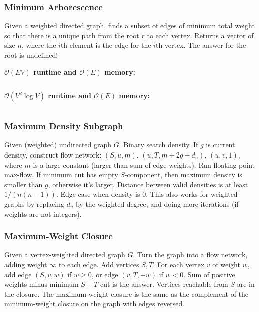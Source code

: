 \documentclass[9pt,a4paper,landscape,oneside]{amsart}
\newcommand{\mintedstyle}[2]{\inputminted{#1}{code/#2}}
\newcommand{\code}[1]{\mintedstyle{cpp}{#1}}
\begin{document}
\begin{multicols*}{3}
\subsubsection{Minimum Arborescence}
Given a weighted directed graph, finds a subset of edges of minimum
total weight so that there is a unique path from the root $r$ to each
vertex. Returns a vector of size $n$, where the $i$th element is the
edge for the $i$th vertex. The answer for the root is undefined!

\textbf{$\mathcal{O}(EV)$ runtime and $\mathcal{O}(E)$ memory:}
\code{graphs/arborescence.cpp}

\textbf{$\mathcal{O}(V^2 \log V)$ runtime and $\mathcal{O}(E)$ memory:}
\code{graphs/arborescence-v2.cpp}


\subsubsection{Maximum Density Subgraph}
Given (weighted) undirected graph $G$. Binary search density. If $g$ is
current density, construct flow network: $(S, u, m)$, $(u, T,
m+2g-d_u)$, $(u,v,1)$, where $m$ is a large constant (larger than sum
of edge weights). Run floating-point max-flow. If minimum cut has empty
$S$-component, then maximum density is smaller than $g$, otherwise it's
larger. Distance between valid densities is at least $1/(n(n-1))$. Edge
case when density is $0$. This also works for weighted graphs by
replacing $d_u$ by the weighted degree, and doing more iterations (if
weights are not integers).

\subsubsection{Maximum-Weight Closure}
Given a vertex-weighted directed graph $G$. Turn the graph into a flow
network, adding weight $\infty$ to each edge. Add vertices $S,T$. For
each vertex $v$ of weight $w$, add edge $(S,v,w)$ if $w\geq 0$, or edge
$(v,T,-w)$ if $w<0$. Sum of positive weights minus minimum $S-T$ cut is
the answer. Vertices reachable from $S$ are in the closure. The
maximum-weight closure is the same as the complement of the
minimum-weight closure on the graph with edges reversed.


\end{multicols*}
\end{document}
